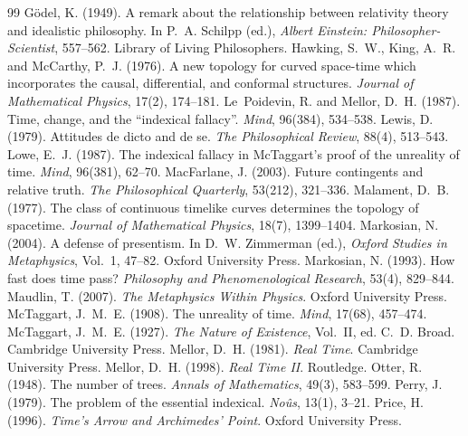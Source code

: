 \documentclass{situationist-preprint}
\begin{document}
\begin{thebibliography}{99}
 Gödel, K. (1949). A remark about the relationship between relativity theory and idealistic philosophy. In P.~A. Schilpp (ed.), \emph{Albert Einstein: Philosopher-Scientist}, 557--562. Library of Living Philosophers.
 Hawking, S.~W., King, A.~R. and McCarthy, P.~J. (1976). A new topology for curved space-time which incorporates the causal, differential, and conformal structures. \emph{Journal of Mathematical Physics}, 17(2), 174--181.
 Le~Poidevin, R. and Mellor, D.~H. (1987). Time, change, and the \enquote{indexical fallacy}. \emph{Mind}, 96(384), 534--538.
 Lewis, D. (1979). Attitudes de dicto and de se. \emph{The Philosophical Review}, 88(4), 513--543.
 Lowe, E.~J. (1987). The indexical fallacy in McTaggart's proof of the unreality of time. \emph{Mind}, 96(381), 62--70.
 MacFarlane, J. (2003). Future contingents and relative truth. \emph{The Philosophical Quarterly}, 53(212), 321--336.
 Malament, D.~B. (1977). The class of continuous timelike curves determines the topology of spacetime. \emph{Journal of Mathematical Physics}, 18(7), 1399--1404.
 Markosian, N. (2004). A defense of presentism. In D.~W. Zimmerman (ed.), \emph{Oxford Studies in Metaphysics}, Vol.~1, 47--82. Oxford University Press.
 Markosian, N. (1993). How fast does time pass? \emph{Philosophy and Phenomenological Research}, 53(4), 829--844.
 Maudlin, T. (2007). \emph{The Metaphysics Within Physics}. Oxford University Press.
 McTaggart, J.~M.~E. (1908). The unreality of time. \emph{Mind}, 17(68), 457--474.
 McTaggart, J.~M.~E. (1927). \emph{The Nature of Existence}, Vol.~II, ed. C.~D. Broad. Cambridge University Press.
 Mellor, D.~H. (1981). \emph{Real Time}. Cambridge University Press.
 Mellor, D.~H. (1998). \emph{Real Time II}. Routledge.
 Otter, R. (1948). The number of trees. \emph{Annals of Mathematics}, 49(3), 583--599.
 Perry, J. (1979). The problem of the essential indexical. \emph{Noûs}, 13(1), 3--21.
 Price, H. (1996). \emph{Time's Arrow and Archimedes' Point}. Oxford University Press.

\end{thebibliography}
\end{document}
